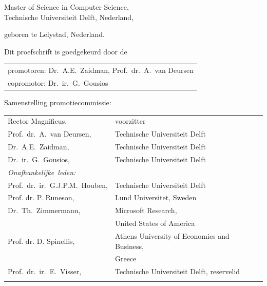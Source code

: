 \begin{titlepage}
\begin{center}
\bigskip
\bigskip

Master of Science in Computer Science, \\
Technische Universiteit Delft, Nederland,

geboren te Lelystad, Nederland.

\vspace*{2\bigskipamount}

\end{center}

\clearpage
\thispagestyle{empty}

\noindent Dit proefschrift is goedgekeurd door de

\medskip\noindent
\begin{tabular}{l}
    promotoren: Dr.\ A.E.\ Zaidman, Prof.\ dr.\ A.\ van Deursen \\
    copromotor: Dr.\ ir.\ G.\ Gousios
\end{tabular}

\bigskip
\noindent Samenstelling promotiecommissie:

\medskip\noindent
\begin{tabular}{p{4.5cm}l}
    Rector Magnificus, & voorzitter \\
    Prof.\ dr.\ A.\ van Deursen, & Technische Universiteit Delft \\
    Dr.\ A.E.\ Zaidman, & Technische Universiteit Delft \\
    Dr.\ ir.\ G.\ Gousios, & Technische Universiteit Delft \\

    \medskip
    \mbox{\emph{Onafhankelijke leden:}} & \\
    Prof.\ dr.\ ir.\ G.J.P.M.\ Houben, & Technische Universiteit Delft \\
    Prof. dr. P. Runeson, & Lund Universitet, Sweden \\
    Dr.\ Th.\ Zimmermann, & Microsoft Research, \\ &United States of America \\
    Prof. dr. D. Spinellis, & Athens University of Economics and Business, \\&
    Greece \\
    
    Prof.\ dr.\ ir.\ E.\ Visser, & Technische Universiteit Delft, reservelid \\ \\


\end{tabular}
\end{titlepage}
